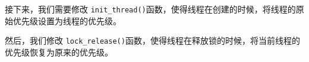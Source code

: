 \documentclass{beamer}
\begin{document}
\begin{frame}
    
    
    
    



\vspace{1em}



  接下来，我们需要修改 \texttt{init\_thread()}函数，使得线程在创建的时候，将线程的原始优先级设置为线程的优先级。






\vspace{1em}



  然后，我们修改 \texttt{lock\_release()}函数，使得线程在释放锁的时候，将当前线程的优先级恢复为原来的优先级。

    

\end{frame}
\end{document}
